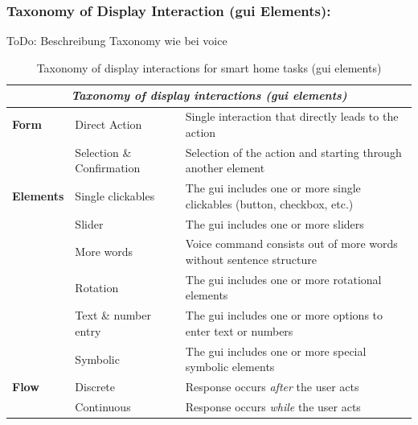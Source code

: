 \documentclass[sigchi]{acmart}
\begin{document}
	\subsubsection{Taxonomy of Display Interaction (\ac{gui} Elements):}
	ToDo: Beschreibung Taxonomy wie bei voice
	\begin{table}[t]
		\begin{center}
			\caption{Taxonomy of display interactions for smart home tasks (\ac{gui} elements)}
			\label{tab:taxDisplayGUI}
			\begin{footnotesize}				
				\begin{tabular}{p{0.2\columnwidth} p{} p{}} \toprule
					\multicolumn{3}{c}{\textit{Taxonomy of display interactions (\ac{gui} elements)}} \\ \midrule
					\textbf{Form}		& Direct Action				& Single interaction that directly leads to the action \\
										& Selection \& Confirmation	& Selection of the action and starting through another element\\ \midrule
					\textbf{Elements} 	& Single clickables			& The \ac{gui} includes one or more single clickables 
																	  (button, checkbox, etc.) \\
										& Slider					& The \ac{gui} includes one or more sliders \\
										& More words				& Voice command consists out of more words without sentence structure \\
										& Rotation					& The \ac{gui} includes one or more rotational elements \\ 
										& Text \& number entry		& The \ac{gui} includes one or more options to enter text or numbers \\
										& Symbolic					& The \ac{gui} includes one or more special symbolic elements\\ \midrule
					\textbf{Flow}		& Discrete		& Response occurs \textit{after} the user acts \\ 
										& Continuous 	& Response occurs \textit{while} the user acts  \\ \bottomrule
				\end{tabular}
			\end{footnotesize}	
		\end{center}
	\end{table}	
\end{document}
